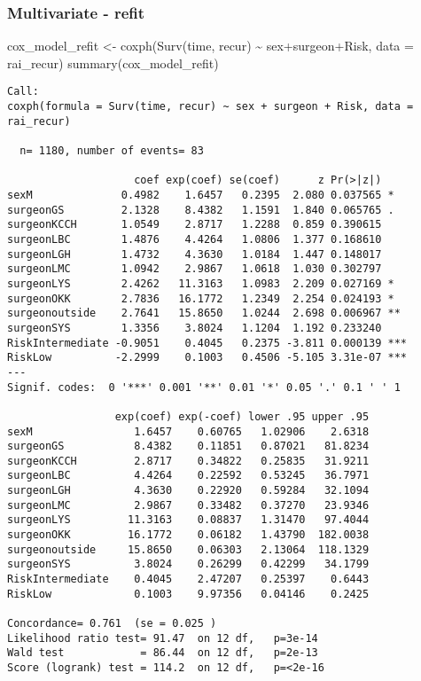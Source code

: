 \documentclass[
  letterpaper,
  DIV=11,
  numbers=noendperiod]{scrartcl}
\newenvironment{Shaded}{\begin{snugshade}}{\end{snugshade}}
\newcommand{\AttributeTok}[1]{\textcolor[rgb]{0.40,0.45,0.13}{#1}}
\newcommand{\FunctionTok}[1]{\textcolor[rgb]{0.28,0.35,0.67}{#1}}
\newcommand{\NormalTok}[1]{\textcolor[rgb]{0.00,0.23,0.31}{#1}}
\newcommand{\OtherTok}[1]{\textcolor[rgb]{0.00,0.23,0.31}{#1}}
\newcommand{\SpecialCharTok}[1]{\textcolor[rgb]{0.37,0.37,0.37}{#1}}
\begin{document}
\subsubsection{Multivariate - refit}\label{multivariate---refit}

\begin{Shaded}
\begin{Highlighting}[]
\NormalTok{cox\_model\_refit }\OtherTok{\textless{}{-}} \FunctionTok{coxph}\NormalTok{(}\FunctionTok{Surv}\NormalTok{(time, recur) }\SpecialCharTok{\textasciitilde{}}\NormalTok{ sex}\SpecialCharTok{+}\NormalTok{surgeon}\SpecialCharTok{+}\NormalTok{Risk, }\AttributeTok{data =}\NormalTok{ rai\_recur)}
\FunctionTok{summary}\NormalTok{(cox\_model\_refit)}
\end{Highlighting}
\end{Shaded}

\begin{verbatim}
Call:
coxph(formula = Surv(time, recur) ~ sex + surgeon + Risk, data = rai_recur)

  n= 1180, number of events= 83 

                    coef exp(coef) se(coef)      z Pr(>|z|)    
sexM              0.4982    1.6457   0.2395  2.080 0.037565 *  
surgeonGS         2.1328    8.4382   1.1591  1.840 0.065765 .  
surgeonKCCH       1.0549    2.8717   1.2288  0.859 0.390615    
surgeonLBC        1.4876    4.4264   1.0806  1.377 0.168610    
surgeonLGH        1.4732    4.3630   1.0184  1.447 0.148017    
surgeonLMC        1.0942    2.9867   1.0618  1.030 0.302797    
surgeonLYS        2.4262   11.3163   1.0983  2.209 0.027169 *  
surgeonOKK        2.7836   16.1772   1.2349  2.254 0.024193 *  
surgeonoutside    2.7641   15.8650   1.0244  2.698 0.006967 ** 
surgeonSYS        1.3356    3.8024   1.1204  1.192 0.233240    
RiskIntermediate -0.9051    0.4045   0.2375 -3.811 0.000139 ***
RiskLow          -2.2999    0.1003   0.4506 -5.105 3.31e-07 ***
---
Signif. codes:  0 '***' 0.001 '**' 0.01 '*' 0.05 '.' 0.1 ' ' 1

                 exp(coef) exp(-coef) lower .95 upper .95
sexM                1.6457    0.60765   1.02906    2.6318
surgeonGS           8.4382    0.11851   0.87021   81.8234
surgeonKCCH         2.8717    0.34822   0.25835   31.9211
surgeonLBC          4.4264    0.22592   0.53245   36.7971
surgeonLGH          4.3630    0.22920   0.59284   32.1094
surgeonLMC          2.9867    0.33482   0.37270   23.9346
surgeonLYS         11.3163    0.08837   1.31470   97.4044
surgeonOKK         16.1772    0.06182   1.43790  182.0038
surgeonoutside     15.8650    0.06303   2.13064  118.1329
surgeonSYS          3.8024    0.26299   0.42299   34.1799
RiskIntermediate    0.4045    2.47207   0.25397    0.6443
RiskLow             0.1003    9.97356   0.04146    0.2425

Concordance= 0.761  (se = 0.025 )
Likelihood ratio test= 91.47  on 12 df,   p=3e-14
Wald test            = 86.44  on 12 df,   p=2e-13
Score (logrank) test = 114.2  on 12 df,   p=<2e-16
\end{verbatim}
\end{document}
